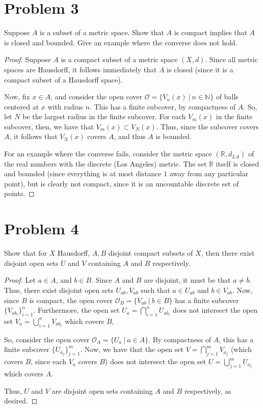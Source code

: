 \documentclass[fontsize=11pt]{scrartcl} %
\numberwithin{equation}{section} %
\numberwithin{figure}{section} %
\numberwithin{table}{section} %
\newcommand{\R}{\mathbb{R}}
\newcommand{\N}{\mathbb{N}}
\begin{document}
\newpage

\section*{Problem 3}
Suppose $A$ is a subset of a metric space. Show that $A$ is compact implies that
$A$ is closed and bounded. Give an example where the converse does not hold.
\\
\begin{proof}
    Suppose $A$ is a compact subset of a metric space $(X,d)$. Since all metric
    spaces are Hausdorff, it follows immediately that $A$ is closed (since it is
    a compact subset of a Hausdorff space).

    Now, fix $x\in A$, and consider the open cover $\mathscr{O} = \{V_n(x)\ |\
    n\in\N\}$ of balls centered at $x$ with radius $n$. This has a finite
    subcover, by compactness of $A$. So, let $N$ be the largest radius in the
    finite subcover. For each $V_m(x)$ in the finite subcover, then, we have
    that $V_m(x)\subset V_N(x)$. Thus, since the subcover covers $A$, it follows
    that $V_N(x)$ covers $A$, and thus $A$ is bounded.

    For an example where the converse fails, consider the metric space
    $(\R,d_{LA})$ of the real numbers with the discrete (Los Angeles) metric.
    The set $\R$ itself is closed and bounded (since everything is at most
    distance $1$ away from any particular point), but is clearly not compact,
    since it is an uncountable discrete set of points.
\end{proof}

\section*{Problem 4}
Show that for $X$ Hausdorff, $A,B$ disjoint compact subsets of $X$, then there
exist disjoint open sets $U$ and $V$ containing $A$ and $B$ respectively.
\\
\begin{proof}
Let $a\in A$, and $b\in B$. Since $A$ and $B$ are disjoint, it must be that
    $a\neq b$. Thus, there exist disjoint open sets $U_{ab},V_{ab}$ such that $a\in
    U_{ab}$ and $b\in V_{ab}$. Now, since $B$ is compact, the open cover
    $\mathscr{O}_B = \{V_{ab}\ |\ b\in B\}$ has a finite subcover
    $\{V_{ab_i}\}_{i=1}^n$. Furthermore, the open set $U_a =
    \bigcap_{i=1}^nU_{ab_i}$ does not intersect the open set $V_a =
    \bigcup_{i=1}^nV_{ab_i}$ which covers $B$,

    So, consider the open cover $\mathscr{O}_A = \{U_a\ |\ a\in A\}$. By
    compactness of $A$, this has a finite subcover $\{U_{a_j}\}_{j=1}^m$. Now,
    we have that the open set $V = \bigcap_{j=1}^mV_{a_j}$ (which covers $B$, since
    each $V_a$ covers $B$) does not intersect the open set $U =
    \bigcup_{j=1}^mU_{a_j}$ which covers $A$.

    Thus, $U$ and $V$ are disjoint open sets containing $A$ and $B$
    respectively, as desired.
\end{proof}
\end{document}
